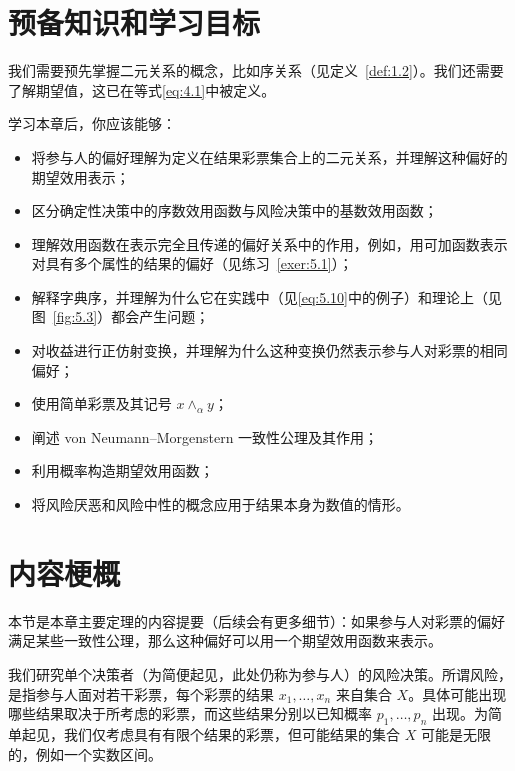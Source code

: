 \section{预备知识和学习目标}\label{sec:5.1}
我们需要预先掌握二元关系的概念，比如序关系（见定义~\ref{def:1.2}）。我们还需要了解期望值，这已在等式\eqref{eq:4.1}中被定义。

学习本章后，你应该能够：
\begin{itemize}
    \item 将参与人的偏好理解为定义在结果彩票集合上的二元关系，并理解这种偏好的期望效用表示；
    
    \item 区分确定性决策中的序数效用函数与风险决策中的基数效用函数；
    
    \item 理解效用函数在表示完全且传递的偏好关系中的作用，例如，用可加函数表示对具有多个属性的结果的偏好（见练习~\ref{exer:5.1}）；
    
    \item 解释字典序，并理解为什么它在实践中（见\eqref{eq:5.10}中的例子）和理论上（见图~\ref{fig:5.3}）都会产生问题；
    
    \item 对收益进行正仿射变换，并理解为什么这种变换仍然表示参与人对彩票的相同偏好；
    
    \item 使用简单彩票及其记号 \(x\wedge_{\alpha}y\)；
    
    \item 阐述 von Neumann--Morgenstern 一致性公理及其作用；
    
    \item 利用概率构造期望效用函数；
    
    \item 将风险厌恶和风险中性的概念应用于结果本身为数值的情形。
\end{itemize}

\section{内容梗概}\label{sec:5.2}
本节是本章主要定理的内容提要（后续会有更多细节）：如果参与人对彩票的偏好满足某些一致性公理，那么这种偏好可以用一个期望效用函数来表示。

我们研究单个决策者（为简便起见，此处仍称为参与人）的风险决策。所谓风险，是指参与人面对若干彩票，每个彩票的结果 \({x}_{1},\ldots ,{x}_{n}\) 来自集合 \(X\)。具体可能出现哪些结果取决于所考虑的彩票，而这些结果分别以已知概率 \({p}_{1},\ldots ,{p}_{n}\) 出现。为简单起见，我们仅考虑具有有限个结果的彩票，但可能结果的集合 \(X\) 可能是无限的，例如一个实数区间。

